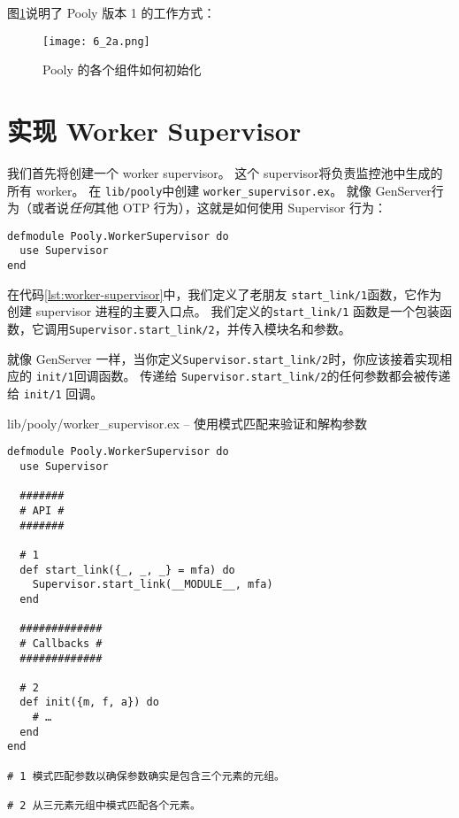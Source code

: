 图\ref{fig:6_2a}说明了 Pooly 版本 1 的工作方式：

\begin{figure}[!ht]
    \centering
    \texttt{[image: 6\_2a.png]}
    \caption{Pooly 的各个组件如何初始化}
    \label{fig:6_2a}
\end{figure}

\section{实现 Worker Supervisor}

我们首先将创建一个 worker supervisor。
这个 supervisor将负责监控池中生成的所有 worker。
在 \texttt{lib/pooly}中创建 \texttt{worker\_supervisor.ex}。
就像 GenServer行为（或者说\emph{任何}其他 OTP 行为），这就是如何使用 Supervisor 行为：

\begin{code}{}
\begin{verbatim}
defmodule Pooly.WorkerSupervisor do
  use Supervisor
end
\end{verbatim}
\end{code}

在代码\ref{lst:worker-supervisor}中，我们定义了老朋友 \texttt{start\_link/1}函数，它作为创建 supervisor 进程的主要入口点。
我们定义的\texttt{start\_link/1} 函数是一个包装函数，它调用\texttt{Supervisor.start\_link/2}，并传入模块名和参数。

就像 GenServer 一样，当你定义\texttt{Supervisor.start\_link/2}时，你应该接着实现相应的 \texttt{init/1}回调函数。
传递给 \texttt{Supervisor.start\_link/2}的任何参数都会被传递给 \texttt{init/1} 回调。

\begin{code}{lib/pooly/worker\_supervisor.ex -- 使用模式匹配来验证和解构参数}
\begin{verbatim}
defmodule Pooly.WorkerSupervisor do
  use Supervisor

  #######
  # API #
  #######

  # 1
  def start_link({_, _, _} = mfa) do
    Supervisor.start_link(__MODULE__, mfa)
  end

  #############
  # Callbacks #
  #############

  # 2
  def init({m, f, a}) do
    # …
  end
end

# 1 模式匹配参数以确保参数确实是包含三个元素的元组。

# 2 从三元素元组中模式匹配各个元素。
\end{verbatim}
\label{lst:worker-supervisor}
\end{code}


